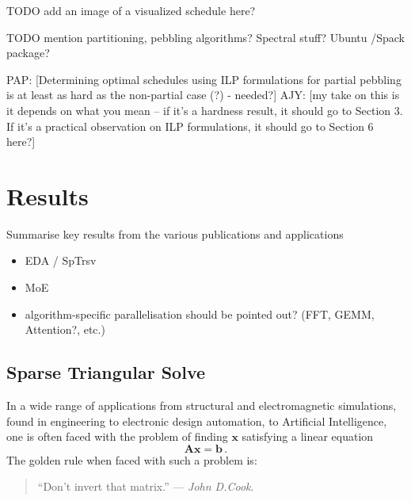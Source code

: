 \documentclass[oneside,reqno, a4paper]{amsart}
\numberwithin{equation}{section}
\let\Oldsection\section
\renewcommand{\section}{\FloatBarrier\Oldsection}
\newcommand{\vect}[1]{{\boldsymbol{#1}}}
\newcommand{\pap}[1]{{\color{blue} \sf PAP: [#1]}}
\newcommand{\ajy}[1]{{\color{orange} \sf AJY: [#1]}}
\begin{document}
TODO add an image of a visualized schedule here?

TODO mention partitioning, pebbling algorithms? Spectral stuff? Ubuntu /Spack package? 

\pap{Determining optimal schedules using ILP formulations for partial pebbling is at least as hard as the non-partial case (?) - needed?}
\ajy{my take on this is it depends on what you mean -- if it's a hardness result, it should go to Section 3. If it's a practical observation on ILP formulations, it should go to Section 6 here?}


\section{Results}

 Summarise key results from the various publications and applications
\begin{itemize}
	\item EDA / SpTrsv
	\item MoE
	\item algorithm-specific parallelisation should be pointed out? (FFT, GEMM, Attention?, etc.)
\end{itemize}


\subsection{Sparse Triangular Solve}
	In a wide range of applications from structural and electromagnetic simulations, found in engineering to electronic design automation, to Artificial Intelligence, one is often faced with the problem of finding $\vect{x}$ satisfying a linear equation
	\begin{equation} \label{eq:linear-eq}
		\vect{A}\vect{x} = \vect{b}\,.
	\end{equation}
	The golden rule when faced with such a problem is:

\begin{quote}
\begin{center}
	``Don't invert that matrix.'' --- \emph{John D.\@ Cook}.
\end{center}
\end{quote}
\end{document}

